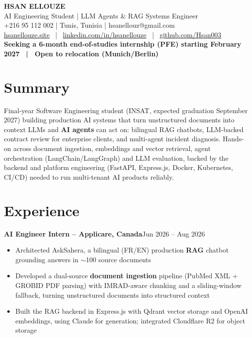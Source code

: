 \documentclass[10pt,a4paper]{article}
\newcommand{\entry}[2]{\vspace{1pt}\noindent\textbf{#1}\hfill{\color{muted}#2}\par}
\begin{document}
\begin{center}
  {\LARGE\bfseries HSAN ELLOUZE}\\[2pt]
  {\color{muted} AI Engineering Student | LLM Agents \& RAG Systems Engineer}\\[2pt]
  {\footnotesize +216 95 112 002 | Tunis, Tunisia | hsanellouz@gmail.com}\\[1pt]
  {\footnotesize \href{https://hsanellouze.site}{hsanellouze.site} \ | \ \href{https://linkedin.com/in/hsanellouze}{linkedin.com/in/hsanellouze} \ | \ \href{https://github.com/Hsan003}{github.com/Hsan003}}\\[3pt]
  {\footnotesize\bfseries Seeking a 6-month end-of-studies internship (PFE) starting February 2027 \ | \ Open to relocation (Munich/Berlin)}
\end{center}

\section{Summary}
Final-year Software Engineering student (INSAT, expected graduation September 2027) building production AI systems that turn unstructured documents into context LLMs and \textbf{AI agents} can act on: bilingual RAG chatbots, LLM-backed contract review for enterprise clients, and multi-agent incident diagnosis. Hands-on across document ingestion, embeddings and vector retrieval, agent orchestration (LangChain/LangGraph) and LLM evaluation, backed by the backend and platform engineering (FastAPI, Express.js, Docker, Kubernetes, CI/CD) needed to run multi-tenant AI products reliably.

\section{Experience}
\entry{AI Engineer Intern -- Applicare, Canada}{Jun 2026 -- Aug 2026}
\begin{itemize}
  \item Architected AskSahera, a bilingual (FR/EN) production \textbf{RAG} chatbot grounding answers in $\sim$100 source documents
  \item Developed a dual-source \textbf{document ingestion} pipeline (PubMed XML + GROBID PDF parsing) with IMRAD-aware chunking and a sliding-window fallback, turning unstructured documents into structured context
  \item Built the RAG backend in Express.js with Qdrant vector storage and OpenAI embeddings, using Claude for generation; integrated Cloudflare R2 for object storage
\end{itemize}
\end{document}

